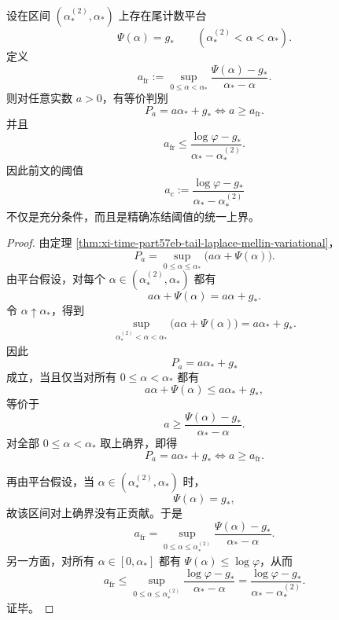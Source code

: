 \begin{theorem}[冻结阈值的精确变分刻画]\label{thm:xi-time-part57eb-freezing-threshold-exact-variational}
设在区间 \((\alpha_*^{(2)},\alpha_*)\) 上存在尾计数平台
\[
\Psi(\alpha)=g_*
\qquad
(\alpha_*^{(2)}<\alpha<\alpha_*).
\]
定义
\[
a_{\mathrm{fr}}
:=
\sup_{0\le \alpha<\alpha_*}
\frac{\Psi(\alpha)-g_*}{\alpha_*-\alpha}.
\]
则对任意实数 \(a>0\)，有等价判别
\[
\boxed{\;
P_a=a\alpha_*+g_*
\iff
a\ge a_{\mathrm{fr}}.\;}
\]
并且
\[
\boxed{\;
a_{\mathrm{fr}}
\le
\frac{\log\varphi-g_*}{\alpha_*-\alpha_*^{(2)}}.\;}
\]
因此前文的阈值
\[
a_{\mathrm c}:=\frac{\log\varphi-g_*}{\alpha_*-\alpha_*^{(2)}}
\]
不仅是充分条件，而且是精确冻结阈值的统一上界。
\end{theorem}
\begin{proof}
由定理 \ref{thm:xi-time-part57eb-tail-laplace-mellin-variational}，
\[
P_a=\sup_{0\le \alpha\le \alpha_*}\bigl(a\alpha+\Psi(\alpha)\bigr).
\]
由平台假设，对每个 \(\alpha\in(\alpha_*^{(2)},\alpha_*)\) 都有
\[
a\alpha+\Psi(\alpha)=a\alpha+g_*.
\]
令 \(\alpha\uparrow\alpha_*\)，得到
\[
\sup_{\alpha_*^{(2)}<\alpha<\alpha_*}\bigl(a\alpha+\Psi(\alpha)\bigr)
=
a\alpha_*+g_*.
\]
因此
\[
P_a=a\alpha_*+g_*
\]
成立，当且仅当对所有 \(0\le \alpha<\alpha_*\) 都有
\[
a\alpha+\Psi(\alpha)\le a\alpha_*+g_*,
\]
等价于
\[
a\ge \frac{\Psi(\alpha)-g_*}{\alpha_*-\alpha}.
\]
对全部 \(0\le \alpha<\alpha_*\) 取上确界，即得
\[
P_a=a\alpha_*+g_*
\iff
a\ge a_{\mathrm{fr}}.
\]

再由平台假设，当 \(\alpha\in(\alpha_*^{(2)},\alpha_*)\) 时，
\[
\Psi(\alpha)=g_*,
\]
故该区间对上确界没有正贡献。于是
\[
a_{\mathrm{fr}}
=
\sup_{0\le \alpha\le \alpha_*^{(2)}}
\frac{\Psi(\alpha)-g_*}{\alpha_*-\alpha}.
\]
另一方面，对所有 \(\alpha\in[0,\alpha_*]\) 都有 \(\Psi(\alpha)\le \log\varphi\)，从而
\[
a_{\mathrm{fr}}
\le
\sup_{0\le \alpha\le \alpha_*^{(2)}}
\frac{\log\varphi-g_*}{\alpha_*-\alpha}
=
\frac{\log\varphi-g_*}{\alpha_*-\alpha_*^{(2)}}.
\]
证毕。
\end{proof}


